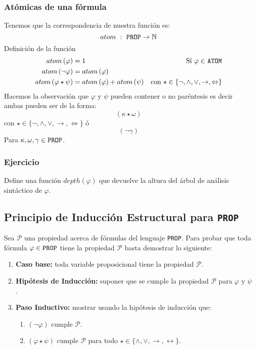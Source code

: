 \documentclass[a4paper]{article}
\begin{document}
\subsubsection{Atómicas de una fórmula}
\noindent
Tenemos que la correspondencia de nuestra función es:
\[
      atom \ : \ \text{\texttt{PROP}} \to \mathbb{N}
\]
Definición de la función
\begin{align*}
    atom\left(\varphi\right) &= 1 &\text{Sí \(\varphi \in\) \texttt{ATOM}} \\
    atom\left(\neg \varphi\right) &= atom\left(\varphi\right) & \\
    atom\left(\varphi \star \psi \right) &= atom\left(\varphi\right) + atom\left(\psi\right) & \text{con \(\star \in \{ \neg, \land, \lor, \rightarrow, \Leftrightarrow \}\)} \\
\end{align*}
Hacemos la observación que \(\varphi\) y \(\psi\) pueden contener o no paréntesis es decir ambas pueden ser de la forma:
\[
    \left(\kappa \star \omega \right)  
\]
con \(\star \in \{ \neg, \land, \lor, \rightarrow, \Leftrightarrow \}\) ó
\[
    \left(\neg \gamma\right)
\]
Para \(\kappa, \omega, \gamma \in \text{\texttt{PROP}}\).
\subsubsection{Ejercicio}
\noindent
Define una función \(depth\left(\varphi\right)\) que devuelve la altura del árbol de análisis sintáctico de \(\varphi\).
\subsection{Principio de Inducción Estructural para \texttt{PROP}}
\noindent
Sea \(\mathcal{P}\) una propiedad acerca de fórmulas del lenguaje \texttt{PROP}. Para probar que toda fórmula 
\(\varphi \in \text{\texttt{PROP}}\) tiene la propiedad \(\mathcal{P}\) basta demostrar lo siguiente:
\begin{enumerate}
    \item \textbf{Caso base: }toda variable proposicional tiene la propiedad \(\mathcal{P}\).
    \item \textbf{Hipótesis de Inducción: } suponer que se cumple la propiedad \(\mathcal{P}\) para \(\varphi\) y \(\psi\).
    \item \textbf{Paso Inductivo: } mostrar usando la hipótesis de inducción que:
    \begin{enumerate}
        \item \(\left(\neg \varphi\right)\) cumple \(\mathcal{P}\).
        \item \(\left(\varphi \star \psi\right)\) cumple \(\mathcal{P}\) para todo \(\star \in \{\land, \lor, \rightarrow, \leftrightarrow\}\).
    \end{enumerate}
\end{enumerate}
\end{document}
